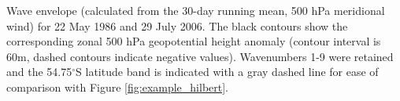 \label{fig:example_envelope}
Wave envelope (calculated from the 30-day running mean, 500 hPa meridional wind) for 22 May 1986 and 29 July 2006. The black contours show the corresponding zonal 500 hPa geopotential height anomaly (contour interval is 60m, dashed contours indicate negative values). Wavenumbers 1-9 were retained and the 54.75$^{\circ}$S latitude band is indicated with a gray dashed line for ease of comparison with Figure \ref{fig:example_hilbert}. 